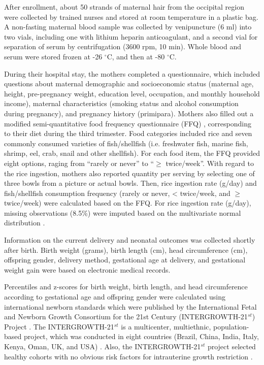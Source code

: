 After enrollment, about 50 strands of maternal hair from the occipital region were collected by trained nurses and stored at room temperature in a plastic bag. A non-fasting maternal blood sample was collected by venipuncture (6 ml) into two vials, including one with lithium heparin anticoagulant, and a second vial for separation of serum by centrifugation (3600 rpm, 10 min). Whole blood and serum were stored frozen at -26 \({^\circ}\)C, and then at -80 \({^\circ}\)C.

During their hospital stay, the mothers completed a questionnaire, which included questions about maternal demographic and socioeconomic status (maternal age, height, pre-pregnancy weight, education level, occupation, and monthly household income), maternal characteristics (smoking status and alcohol consumption during pregnancy), and pregnancy history (primipara). Mothers also filled out a modified semi-quantitative food frequency questionnaire (FFQ) \citep{cheng2009assessment}, corresponding to their diet during the third trimester. Food categories included rice and seven commonly consumed varieties of fish/shellfish (i.e. freshwater fish, marine fish, shrimp, eel, crab, snail and other shellfish). For each food item, the FFQ provided eight options, raging from ``rarely or never'' to ``${\ge}$ twice/week''. With regard to the rice ingestion, mothers also reported quantity per serving by selecting one of three bowls from a picture or actual bowls. Then, rice ingestion rate (g/day) and fish/shellfish consumption frequency (rarely or never, < twice/week, and ${\ge}$ twice/week) were calculated based on the FFQ. For rice ingestion rate (g/day), missing observations (8.5\%) were imputed based on the multivariate normal distribution \citep{schafer1997analysis}.

Information on the current delivery and neonatal outcomes was collected shortly after birth. Birth weight (grams), birth length (cm), head circumference (cm), offspring gender, delivery method, gestational age at delivery, and gestational weight gain were based on electronic medical records.

Percentiles and z-scores for birth weight, birth length, and head circumference according to gestational age and offspring gender were calculated using international newborn standards which were published by the International Fetal and Newborn Growth Consortium for the 21st Century (INTERGROWTH-21$^{st}$) Project \citep{villar2014international}. The INTERGROWTH-21$^{st}$ is a multicenter, multiethnic, population-based project, which was conducted in eight countries (Brazil, China, India, Italy, Kenya, Oman, UK, and USA) \citep{villar2013objectives}. Also, the INTERGROWTH-21$^{st}$ project selected healthy cohorts with no obvious risk factors for intrauterine growth restriction \citep{villar2013objectives}.

